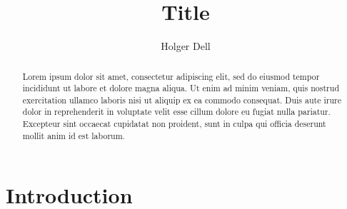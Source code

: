 \documentclass[a4paper,USenglish,cleveref,autoref,thm-restate]{lipics-v2021}
\title{Title}
\author{Holger Dell}{Goethe University Frankfurt, Frankfurt, Germany \and IT University of Copenhagen, Copenhagen, Denmark \and Basic Algorithms Research Copenhagen (BARC)}{dell@uni-frankfurt.de}{https://orcid.org/0000-0001-8955-0786}{}
\begin{document}
\maketitle

\begin{abstract}
  Lorem ipsum dolor sit amet, consectetur adipiscing elit, sed do eiusmod tempor incididunt ut labore et dolore magna aliqua. Ut enim ad minim veniam, quis nostrud exercitation ullamco laboris nisi ut aliquip ex ea commodo consequat. Duis aute irure dolor in reprehenderit in voluptate velit esse cillum dolore eu fugiat nulla pariatur. Excepteur sint occaecat cupidatat non proident, sunt in culpa qui officia deserunt mollit anim id est laborum.
  \cite{DBLP:journals/jsyml/Turing37}
\end{abstract}

 
\section{Introduction}



\end{document}
